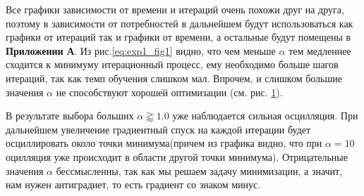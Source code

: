 \begin{enumerate}
\begin{figure}[h]
\begin{subfigure}{.5\textwidth}
            \caption{}
        \end{subfigure}
    \caption{}
	\end{figure}\label{eq:exp1_fig1}
	Все графики зависимости от времени и итераций очень похожи друг на друга, поэтому в зависимости от потребностей в дальнейшем будут использоваться как графики от итераций так и графики от времени, а остальные будут помещены в {\bfseries Приложении А}. Из рис.\ref{eq:exp1_fig1} видно, что чем меньше $\alpha$ тем медленнее сходится к минимуму итерационный процесс, ему необходимо больше шагов итераций, так как темп обучения слишком мал. Впрочем, и слишком большие значения $\alpha$ не способствуют хорошей оптимизации (см. рис. \ref{eq:exp1_fig2}).
	\begin{figure}[h]
		
		\caption{}
		\label{eq:exp1_fig2}
	\end{figure}
	В результате выбора больших $\alpha \gtrapprox\!\!1.0$ уже наблюдается сильная осцилляция. При дальнейшем увеличение градиентный спуск на каждой итерации будет осциллировать около точки минимума(причем из графика видно, что при $\alpha = 10$ оцилляция уже происходит в области другой точки минимума). 
	Отрицательные значения  $\alpha$ бессмысленны, так как мы решаем задачу минимизации, а значит, нам нужен антиградиет, то есть градиент со знаком минус.
    \begin{figure}[h]
        \begin{subfigure}{.5\textwidth}
            \centering

\end{subfigure}
\end{figure}
\end{enumerate}
